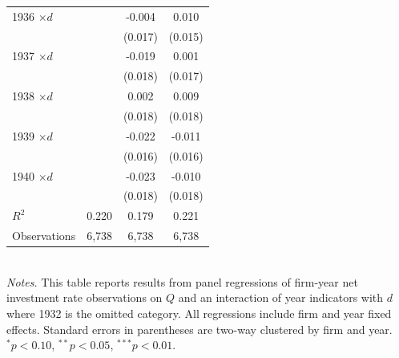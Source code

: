 \begin{table}[p]
\begin{tabular}{lccc}
1936 $\times d$  &                & -0.004          & 0.010          \\
                 &                & (0.017)        & (0.015)        \\
1937 $\times d$  &                & -0.019          & 0.001          \\
                 &                & (0.018)        & (0.017)        \\
1938 $\times d$  &                & 0.002           & 0.009          \\
                 &                & (0.018)        & (0.018)        \\
1939 $\times d$  &                & -0.022          & -0.011         \\
                 &                & (0.016)        & (0.016)        \\
1940 $\times d$  &                & -0.023          & -0.010         \\
                 &                & (0.018)        & (0.018)        \\
\midrule
$R^2$            & 0.220          & 0.179          & 0.221 \\
Observations     & 6{,}738        & 6{,}738        & 6{,}738 \\
\bottomrule
\end{tabular} \\

\vspace*{3mm} \justifying \noindent
\footnotesize{\textit{Notes.} This table reports results from panel regressions of firm-year net investment rate observations on $Q$ and an interaction of year indicators with $d$ where 1932 is the omitted category. All regressions include firm and year fixed effects. Standard errors in parentheses are two-way clustered by firm and year. $^{*}p<0.10$, $^{**}p<0.05$, $^{***}p<0.01$.}
\end{table}